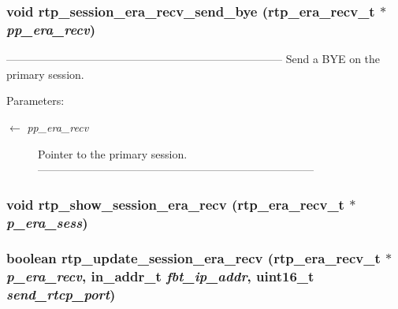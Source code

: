 \subsubsection{\setlength{\rightskip}{0pt plus 5cm}void rtp\_\-session\_\-era\_\-recv\_\-send\_\-bye (\bf{rtp\_\-era\_\-recv\_\-t} $\ast$ {\em pp\_\-era\_\-recv})}\label{rtp__era__recv_8c_677955d12269304e7c2e0079f025e1b9}


--------------------------------------------------------------------------- Send a BYE on the primary session.

\begin{Desc}
\item[Parameters:]
\begin{description}
\item[\mbox{$\leftarrow$} {\em pp\_\-era\_\-recv}]Pointer to the primary session. --------------------------------------------------------------------------- \end{description}
\end{Desc}
\subsubsection{\setlength{\rightskip}{0pt plus 5cm}void rtp\_\-show\_\-session\_\-era\_\-recv (\bf{rtp\_\-era\_\-recv\_\-t} $\ast$ {\em p\_\-era\_\-sess})}\label{rtp__era__recv_8c_306a6d64c5e6a6c633cdc813030552e2}


\subsubsection{\setlength{\rightskip}{0pt plus 5cm}boolean rtp\_\-update\_\-session\_\-era\_\-recv (\bf{rtp\_\-era\_\-recv\_\-t} $\ast$ {\em p\_\-era\_\-recv}, in\_\-addr\_\-t {\em fbt\_\-ip\_\-addr}, uint16\_\-t {\em send\_\-rtcp\_\-port})}\label{rtp__era__recv_8c_a3439cae09397ed5241ddf6c5337f1f8}



